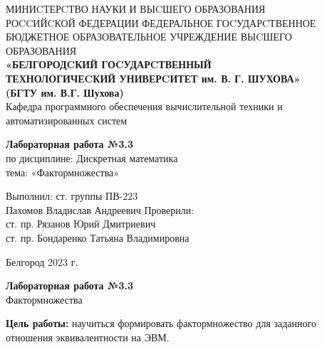 \documentclass[a4paper,14pt]{extarticle}
\newcommand\textbox[1]{
	\parbox{.45\textwidth}{#1}
}
\begin{document}
\begin{center}
	\small{
		МИНИCТЕРCТВО НАУКИ И ВЫCШЕГО ОБРАЗОВАНИЯ \\РОCCИЙCКОЙ ФЕДЕРАЦИИ
		\bigbreak
		ФЕДЕРАЛЬНОЕ ГОCУДАРCТВЕННОЕ БЮДЖЕТНОЕ ОБРАЗОВАТЕЛЬНОЕ УЧРЕЖДЕНИЕ ВЫCШЕГО ОБРАЗОВАНИЯ \\
		\bigbreak
		\textbf{«БЕЛГОРОДCКИЙ ГОCУДАРCТВЕННЫЙ \\ТЕХНОЛОГИЧЕCКИЙ УНИВЕРCИТЕТ им. В. Г. ШУХОВА»\\ (БГТУ им. В.Г. Шухова)} \\
		\bigbreak
		Кафедра программного обеспечения вычислительной техники и автоматизированных систем\\}
\end{center}

\vfill
\begin{center}
	\large{
		\textbf{
			Лабораторная работа №3.3}}\\
	\normalsize{
		по дисциплине: Дискретная математика \\
		тема: «Фактормножества»}
\end{center}
\vfill
\hfill\textbox{
	Выполнил: ст. группы ПВ-223\\Пахомов Владислав Андреевич
	\bigbreak
	Проверили: \\ст. пр. Рязанов Юрий Дмитриевич\\
	ст. пр. Бондаренко Татьяна Владимировна
}
\vfill\begin{center}
	Белгород 2023 г.
\end{center}
\newpage
\begin{center}
	\textbf{Лабораторная работа №3.3}\\
	Фактормножества
\end{center}
\textbf{Цель работы: }научиться формировать фактормножество для заданного
отношения эквивалентности на ЭВМ.
\end{document}

